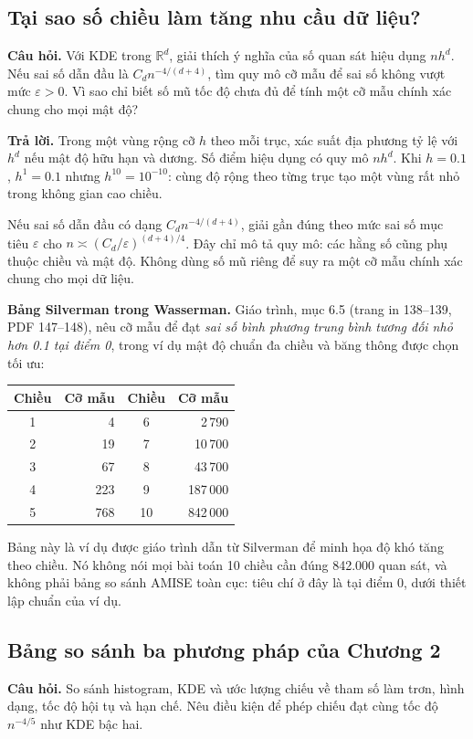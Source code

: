 \documentclass[11pt,a4paper]{article}
\newcommand{\R}{\mathbb R}
\begin{document}
\subsection{Tại sao số chiều làm tăng nhu cầu dữ liệu?}
\textbf{Câu hỏi.} Với KDE trong $\R^d$, giải thích ý nghĩa của số quan sát hiệu dụng $nh^d$.
Nếu sai số dẫn đầu là $C_dn^{-4/(d+4)}$, tìm quy mô cỡ mẫu để sai số không vượt mức $\varepsilon>0$.
Vì sao chỉ biết số mũ tốc độ chưa đủ để tính một cỡ mẫu chính xác chung cho mọi mật độ?

\textbf{Trả lời.}
Trong một vùng rộng cỡ $h$ theo mỗi trục, xác suất địa phương tỷ lệ với $h^d$ nếu mật độ hữu hạn và dương. Số điểm hiệu dụng có quy mô $nh^d$. Khi $h=0.1$, $h^1=0.1$ nhưng $h^{10}=10^{-10}$: cùng độ rộng theo từng trục tạo một vùng rất nhỏ trong không gian cao chiều.

Nếu sai số dẫn đầu có dạng $C_dn^{-4/(d+4)}$, giải gần đúng theo mức sai số mục tiêu $\varepsilon$ cho $n\asymp(C_d/\varepsilon)^{(d+4)/4}$. Đây chỉ mô tả quy mô: các hằng số cũng phụ thuộc chiều và mật độ. Không dùng số mũ riêng để suy ra một cỡ mẫu chính xác chung cho mọi dữ liệu.

\textbf{Bảng Silverman trong Wasserman.} Giáo trình, mục 6.5 (trang in 138--139, PDF 147--148), nêu cỡ mẫu để đạt \emph{sai số bình phương trung bình tương đối nhỏ hơn 0.1 tại điểm 0}, trong ví dụ mật độ chuẩn đa chiều và băng thông được chọn tối ưu:
\begin{center}
\begin{tabular}{crcr}
\toprule
Chiều & Cỡ mẫu & Chiều & Cỡ mẫu\\
\midrule
1&4&6&2\,790\\
2&19&7&10\,700\\
3&67&8&43\,700\\
4&223&9&187\,000\\
5&768&10&842\,000\\
\bottomrule
\end{tabular}
\end{center}
Bảng này là ví dụ được giáo trình dẫn từ Silverman để minh họa độ khó tăng theo chiều. Nó không nói mọi bài toán 10 chiều cần đúng 842.000 quan sát, và không phải bảng so sánh AMISE toàn cục: tiêu chí ở đây là tại điểm 0, dưới thiết lập chuẩn của ví dụ.

\subsection{Bảng so sánh ba phương pháp của Chương 2}
\textbf{Câu hỏi.} So sánh histogram, KDE và ước lượng chiếu về tham số làm trơn,
hình dạng, tốc độ hội tụ và hạn chế. Nêu điều kiện để phép chiếu đạt cùng tốc độ $n^{-4/5}$ như KDE bậc hai.
\end{document}
